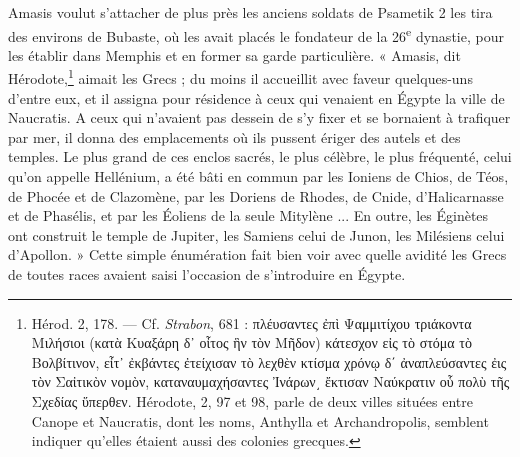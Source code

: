 \documentclass[a4paper, 11pt, oneside]{article}
\begin{document}
Amasis voulut s'attacher de plus près les anciens soldats de Psametik 2 les tira des environs de Bubaste, où les avait placés le fondateur de la 26\textsuperscript{e} dynastie, pour les établir dans Memphis et en former sa garde particulière. « Amasis, dit Hérodote,\footnote{Hérod. 2, 178. --- Cf. \emph{Strabon}, 681 : πλέυσαντες ἐπὶ Ψαμμιτίχου τριάκοντα Μιλήσιοι (κατὰ Κυαξάρη δ᾽ οἶτος ἣν τὸν Μῆδον) κάτεσχον εἰς τὸ στόμα τὸ Βολβίτινον, εἶτ᾽ ἐκβάντες ἐτείχισαν τὸ λεχθὲν κτίσμα χρόνῳ δ΄ ἀναπλεύσαντες ἐις τὸν Σαἰτικὸν νομὸν, καταναυμαχήσαντες Ἰνάρων͵ ἔκτισαν Ναύκρατιν οὗ πολὺ τῆς Σχεδίας ὕπερθεν. Hérodote, 2, 97 et 98, parle de deux villes situées entre Canope et Naucratis, dont les noms, Anthylla et Archandropolis, semblent indiquer qu'elles étaient aussi des colonies grecques.} aimait les Grecs ; du moins il accueillit avec faveur quelques-uns d'entre eux, et il assigna pour résidence à ceux qui venaient en Égypte la ville de Naucratis. A ceux qui n'avaient pas dessein de s'y fixer et se bornaient à trafiquer par mer, il donna des emplacements où ils pussent ériger des autels et des temples. Le plus grand de ces enclos sacrés, le plus célèbre, le plus fréquenté, celui qu'on appelle Hellénium, a été bâti en commun par les Ioniens de Chios, de Téos, de Phocée et de Clazomène, par les Doriens de Rhodes, de Cnide, d'Halicarnasse et de Phasélis, et par les Éoliens de la seule Mitylène ... En outre, les Éginètes ont construit le temple de Jupiter, les Samiens celui de Junon, les Milésiens celui d'Apollon. » Cette simple énumération fait bien voir avec quelle avidité les Grecs de toutes races avaient saisi l'occasion de s'introduire en Égypte.
\end{document}
